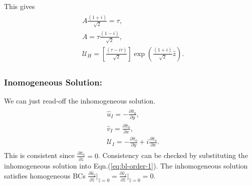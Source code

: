 \documentclass{article}
\newcommand{\pd}[2]{\frac{\partial{#1}}{\partial{#2}}}
\begin{document}
This gives
\begin{align}
 \begin{split}
  & A \frac{(1+i)}{\sqrt{2}} = \tau, \\
  & \boxed{A = \tau \frac{(1-i)}{\sqrt{2}} },\\
  &\boxed{\mathcal{U}_{H} = \left[\frac{(\tau-i\tau)}{\sqrt{2}} \right] \exp{\left(\frac{(1+i)}{\sqrt{2}}\hat{z}\right)} }. 
 \end{split}
\end{align}
%
\subsubsection{Inomogeneous Solution:}
We can just read-off the inhomogeneous solution. 
\begin{align}\label{eq:bl-complex-inhom-upper}
 \begin{split}
  & \hat{u}_{I} = -\pd{\hat{\pi}_{0} }{y},\\
  & \hat{v}_{I} = \pd{\hat{\pi}_{0} }{x},\\
  &\boxed{\mathcal{U}_{I} = -\pd{\hat{\pi}_{0} }{y} + i \pd{\hat{\pi}_{0} }{x}}. 
 \end{split}
\end{align}
This is consistent since $\pd{\hat{\pi}_{0} }{z} = 0$. Consistency can be checked by substituting the inhomogeneous solution into Eqn.(\ref{eq:bl-order-1}). The inhomogeneous solution satisfies homogeneous BCs $ \pd{\hat{u}_{I}}{\hat{z}}\bigg|_{\hat{z} = 0} =  \pd{\hat{v}_{I}}{\hat{z}}\bigg|_{\hat{z} = 0} = 0$.\\
%
\end{document}
